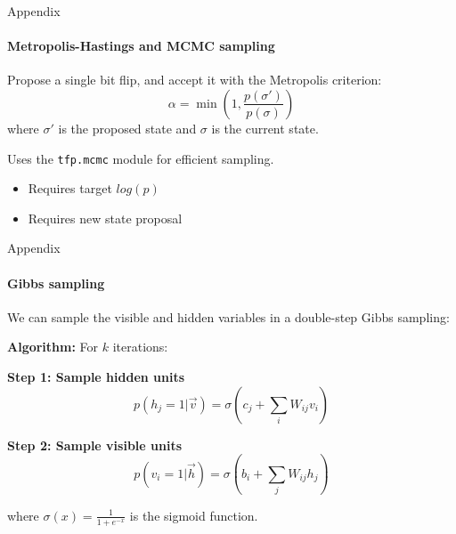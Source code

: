 \documentclass{beamer}
\begin{document}
\begin{frame}[fragile]{Appendix}
\framesubtitle{Metropolis-Hastings and MCMC sampling}
Propose a single bit flip, and accept it with the Metropolis criterion:
$$\alpha = \min\left(1, \frac{p(\sigma')}{p(\sigma)}\right)$$
where $\sigma'$ is the proposed state and $\sigma$ is the current state.
\baselineskip

Uses the \lstinline[style=kaolstplain]|tfp.mcmc| module for efficient sampling.
\begin{itemize}
	\item Requires target $log(p)$
	\item Requires new state proposal
\end{itemize}

\end{frame}

\begin{frame}{Appendix}
\framesubtitle{Gibbs sampling}
We can sample the visible and hidden variables in a double-step Gibbs sampling:

\textbf{Algorithm:} For $k$ iterations:

\textbf{Step 1: Sample hidden units}
$$p(h_j = 1 | \vec{v}) = \sigma\left(c_j + \sum_i W_{ij} v_i\right)$$

\textbf{Step 2: Sample visible units}  
$$p(v_i = 1 | \vec{h}) = \sigma\left(b_i + \sum_j W_{ij} h_j\right)$$

where $\sigma(x) = \frac{1}{1 + e^{-x}}$ is the sigmoid function.
\end{frame}
\end{document}
